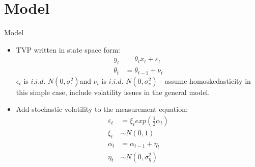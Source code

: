 \documentclass[dvipsnames,mathserif]{beamer}
\begin{document}
{\section{Model}
\begin{frame}{Model}
    \begin{itemize}
        \item TVP written in state space form:\\
            \begin{align}
            y_t &= \theta_tx_t + \varepsilon_t\\
            \theta_t &= \theta_{t-1} + \nu_t
            \end{align}
        $\epsilon_t$ is $i.i.d.$ $N(0,\sigma_\epsilon^2) $and $\nu_t$ is $i.i.d.$ $N(0,\sigma_\nu^2)$ - assume homoskedasticity in this simple case, include volatility issues in the general model.\\
        \item Add stochastic volatility to the measurement equation:\\
            \begin{align*}
            \varepsilon_t &= \xi_t exp\left(\frac{1}{2}\alpha_t\right)\\
            \xi_t &\sim N(0,1)\\
            \alpha_t &= \alpha_{t-1} + \eta_t\\
            \eta_t &\sim N(0, \sigma_\eta^2)
            \end{align*}
        
    \end{itemize}


\end{frame}}
\end{document}

